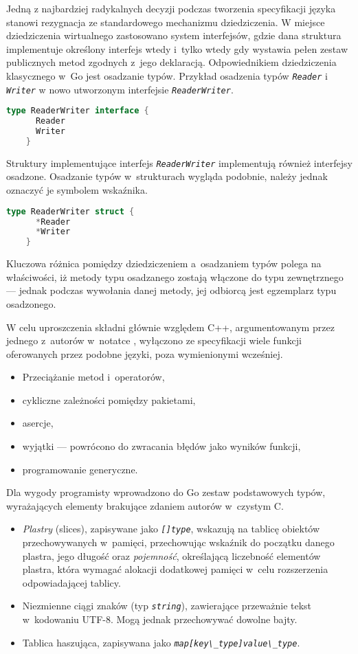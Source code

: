   \par{
  Jedną z najbardziej radykalnych decyzji podczas tworzenia specyfikacji języka stanowi rezygnacja ze standardowego mechanizmu dziedziczenia. W miejsce dziedziczenia wirtualnego zastosowano system interfejsów, gdzie dana struktura implementuje określony interfejs wtedy i~tylko wtedy gdy wystawia pełen zestaw publicznych metod zgodnych z~jego deklaracją. Odpowiednikiem dziedziczenia klasycznego w~Go jest osadzanie typów.
  Przykład osadzenia typów \textit{\lstinline{Reader}} i \textit{\lstinline{Writer}} w nowo utworzonym interfejsie \textit{\lstinline{ReaderWriter}}.
  \begin{lstlisting}[language=go]
    type ReaderWriter interface {
      Reader
      Writer
    }
  \end{lstlisting}
  Struktury implementujące interfejs \textit{\lstinline{ReaderWriter}} implementują również interfejsy osadzone.
  Osadzanie typów w~strukturach wygląda podobnie, należy jednak oznaczyć je symbolem wskaźnika.
  \begin{lstlisting}[language=go]
    type ReaderWriter struct {
      *Reader
      *Writer
    }
  \end{lstlisting}
  Kluczowa różnica pomiędzy dziedziczeniem a~osadzaniem typów polega na właściwości, iż metody typu osadzanego zostają włączone do typu zewnętrznego --- jednak podczas wywołania danej metody, jej odbiorcą jest egzemplarz typu osadzonego. \cite{godoc:embedding}
}
\par {
W celu uproszczenia składni głównie względem C++, argumentowanym przez jednego z~autorów w~notatce \cite{Pike:LessIsMore}, wyłączono ze specyfikacji wiele funkcji oferowanych przez podobne języki, poza wymienionymi wcześniej.
  \begin{itemize}
    \item Przeciążanie metod i~operatorów,
    \item cykliczne zależności pomiędzy pakietami,
    \item asercje,
    \item wyjątki --- powrócono do zwracania błędów jako wyników funkcji,
    \item programowanie generyczne.
  \end{itemize}
}
\par{
  Dla wygody programisty wprowadzono do Go zestaw podstawowych typów, wyrażających elementy brakujące zdaniem autorów w~czystym C.
  \begin{itemize}
    \item \emph{Plastry} (slices), zapisywane jako \textit{\lstinline{[]type}}, wskazują na tablicę obiektów przechowywanych w~pamięci, przechowując wskaźnik do początku danego plastra, jego długość oraz \emph{pojemność}, określającą liczebność elementów plastra, która wymagać alokacji dodatkowej pamięci w~celu rozszerzenia odpowiadającej tablicy.
    \item Niezmienne ciągi znaków (typ \textit{\lstinline{string}}), zawierające przeważnie tekst w~kodowaniu UTF-8. Mogą jednak przechowywać dowolne bajty.
    \item Tablica haszująca, zapisywana jako \textit{\lstinline{map[key\_type]value\_type}}.
  \end{itemize}
}
